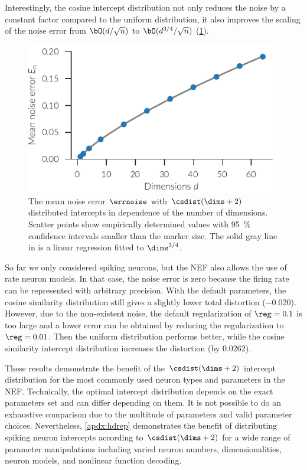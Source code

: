 Interestingly, the cosine intercept distribution not only reduces the noise by a constant factor compared to the uniform distribution, it also improves the scaling of the noise error from $\bO(d/\sqrt{n})$ to $\bO(d^{3/4}/\sqrt{n})$ (\cref{fig:cs-error-scaling}).
\begin{figure}
    \centering
    \includegraphics{figures/cs-error-scaling}
    \caption[Mean noise error with uniform intercepts]{The mean noise error $\errnoise$ with $\csdist(\dims + 2)$ distributed intercepts in dependence of the number of dimensions. Scatter points show empirically determined values with \SI{95}{\percent} confidence intervals smaller than the marker size. The solid gray line in is a linear regression fitted to $\dims^{3/4}$.}\label{fig:cs-error-scaling}
\end{figure}

So far we only considered spiking neurons, but the NEF also allows the use of rate neuron models.
In that case, the noise error is zero because the firing rate can be represented with arbitrary precision.
With the default parameters, the cosine similarity distribution still gives a slightly lower total distortion (\num{-0.020}).
However, due to the non-existent noise, the default regularization of $\reg = 0.1$ is too large and a lower error can be obtained by reducing the regularization to $\reg = 0.01$.
Then the uniform distribution performs better, while the cosine similarity intercept distribution increases the distortion (by \num{+0.0262}).

These results demonstrate the benefit of the $\csdist(\dims + 2)$ intercept distribution for the most commonly used neuron types and parameters in the NEF\@.
Technically, the optimal intercept distribution depends on the exact parameters set and can differ depending on them.
It is not possible to do an exhaustive comparison due to the multitude of parameters and valid parameter choices.
Nevertheless, \cref{apdx:hdrep} demonstrates the benefit of distributing spiking neuron intercepts according to $\csdist(\dims + 2)$ for a wide range of parameter manipulations including varied neuron numbers, dimensionalities, neuron models, and nonlinear function decoding.

